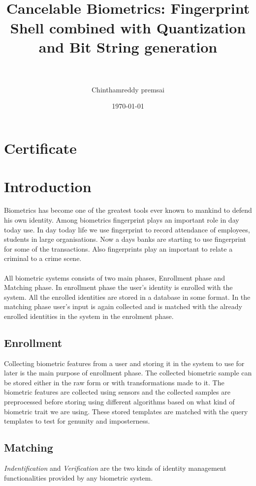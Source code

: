 \documentclass[14pt, oneside]{article}   	%
\title{ \horrule{0.5pt} \\[0.4cm] \huge Cancelable Biometrics: Fingerprint Shell combined with Quantization and Bit String generation \\ \horrule{1.5pt} \\[0.1cm]}
\author{Chinthamreddy premsai}
\date{\today}
\begin{document}
\maketitle
\newpage
\section*{\textbf{Certificate}}
\newpage
\setcounter{tocdepth}{3}
\tableofcontents
\newpage

\section{Introduction}
Biometrics has become one of the greatest tools ever known to mankind to defend his own identity.  Among biometrics fingerprint plays an important role in day today use. In day today life we use fingerprint to record attendance of employees, students in large organisations. Now a days banks are starting to use fingerprint for some of the transactions. Also fingerprints play an important to relate a criminal to a crime scene.
\paragraph{}
All biometric systems consists of two main phases, Enrollment phase and Matching phase. In enrollment phase the user's identity is enrolled with the system. All the enrolled identities are stored in a database in some format. In the matching phase user's input is again collected and is matched with the already enrolled identities in the system in the enrolment phase. 
\subsection{Enrollment}
Collecting biometric features from a user and storing it in the system to use for later is the main purpose of enrollment phase. The collected biometric sample can be stored either in the raw form or with transformations made to it. The biometric features are collected using sensors and the collected samples are preprocessed before storing using different algorithms based on what kind of biometric trait we are using. These stored templates are matched with the query templates to test for genunity and imposterness. 
\subsection{Matching}
\textit{Indentification} and \textit{Verification} are the two kinds of identity management functionalities provided by any biometric system. 
\end{document}
